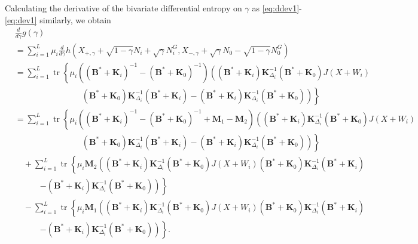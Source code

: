 \documentclass[journal,final, onecolumn]{IEEEtran}
\DeclareMathOperator{\tr}{tr}
\begin{document}
Calculating the derivative of the bivariate differential entropy on $\gamma$ as \eqref{eq:ddev1}-\eqref{eq:dev1} similarly, we obtain
\begin{align}
& \frac{d}{d\gamma}g(\gamma)\nonumber \\
&=\sum_{i=1}^{L} \mu_{i} \frac{d}{d\gamma}h\left(X_{+,\gamma}+\sqrt{1-\gamma}N_{i}+\sqrt{\gamma}N_{i}^{G}, X_{-,\gamma}+\sqrt{\gamma}N_{0}-\sqrt{1-\gamma}N^{G}_{0}\right)\\
& = \sum_{i=1}^{L}\tr \left\{  \mu_{i} \left(      (\boldsymbol{B}^{*} + \boldsymbol{K}_{i})^{-1} - (\boldsymbol{B}^{*} + \boldsymbol{K}_{0})^{-1}  \right) \left(       (\boldsymbol{B}^{*} + \boldsymbol{K}_{i}) \boldsymbol{K}^{-1}_{\Delta_{i}}(\boldsymbol{B}^{*} + \boldsymbol{K}_{0}) J(X+W_i) \right.\right.\nonumber \\
& \qquad \qquad \qquad \qquad \left.\left.(\boldsymbol{B}^{*} + \boldsymbol{K}_{0}) \boldsymbol{K}^{-1}_{\Delta_{i}}(\boldsymbol{B}^{*} + \boldsymbol{K}_{i})  -(\boldsymbol{B}^{*} + \boldsymbol{K}_{i}) \boldsymbol{K}^{-1}_{\Delta_{i}}(\boldsymbol{B}^{*} + \boldsymbol{K}_{0})     \right)         \right\} \label{eq:low1} \\
&= \sum_{i=1}^{L}\tr \left\{  \mu_{i} \left(      (\boldsymbol{B}^{*} + \boldsymbol{K}_{i})^{-1} - (\boldsymbol{B}^{*} + \boldsymbol{K}_{0})^{-1} +\boldsymbol{M}_{1}-\boldsymbol{M}_{2}  \right) \left(       (\boldsymbol{B}^{*} + \boldsymbol{K}_{i}) \boldsymbol{K}^{-1}_{\Delta_{i}}(\boldsymbol{B}^{*} + \boldsymbol{K}_{0}) J(X+W_i) \right.\right.\nonumber \\
& \qquad \qquad \qquad \qquad \left.\left.(\boldsymbol{B}^{*} + \boldsymbol{K}_{0}) \boldsymbol{K}^{-1}_{\Delta_{i}}(\boldsymbol{B}^{*} + \boldsymbol{K}_{i})  -(\boldsymbol{B}^{*} + \boldsymbol{K}_{i}) \boldsymbol{K}^{-1}_{\Delta_{i}}(\boldsymbol{B}^{*} + \boldsymbol{K}_{0})     \right)         \right\} \label{eq:low2}\\
&\quad +\sum_{i=1}^{L} \tr \left\{ \mu_{i} \boldsymbol{M}_{2} \left(      (\boldsymbol{B}^{*} + \boldsymbol{K}_{i}) \boldsymbol{K}^{-1}_{\Delta_{i}}(\boldsymbol{B}^{*} + \boldsymbol{K}_{0}) J(X+W_i)(\boldsymbol{B}^{*} + \boldsymbol{K}_{0}) \boldsymbol{K}^{-1}_{\Delta_{i}}(\boldsymbol{B}^{*} + \boldsymbol{K}_{i}) \right.\right.\nonumber \\
&\quad \qquad \left.\left.  -(\boldsymbol{B}^{*} + \boldsymbol{K}_{i}) \boldsymbol{K}^{-1}_{\Delta_{i}}(\boldsymbol{B}^{*} + \boldsymbol{K}_{0})     \right)         \right\} \label{eq:low3}\\
& \quad - \sum_{i=1}^{L} \tr \left\{ \mu_{i} \boldsymbol{M}_{1} \left(      (\boldsymbol{B}^{*} + \boldsymbol{K}_{i}) \boldsymbol{K}^{-1}_{\Delta_{i}}(\boldsymbol{B}^{*} + \boldsymbol{K}_{0}) J(X+W_i)(\boldsymbol{B}^{*} + \boldsymbol{K}_{0}) \boldsymbol{K}^{-1}_{\Delta_{i}}(\boldsymbol{B}^{*} + \boldsymbol{K}_{i}) \right.\right.\nonumber \\
&\quad \qquad \left.\left.  -(\boldsymbol{B}^{*} + \boldsymbol{K}_{i}) \boldsymbol{K}^{-1}_{\Delta_{i}}(\boldsymbol{B}^{*} + \boldsymbol{K}_{0})     \right)         \right\}.\label{eq:low4}
\end{align}
\end{document}
